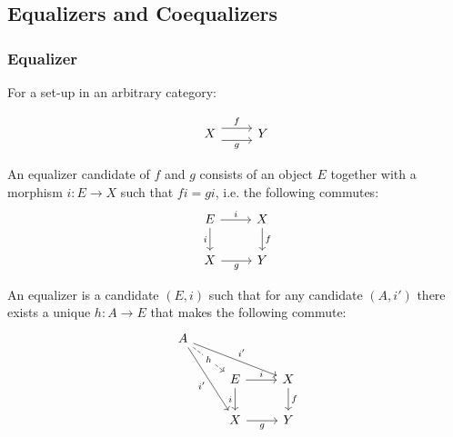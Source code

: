 \subsection{Equalizers and Coequalizers}

\subsubsection*{Equalizer}

\begin{definition}
  For a set-up in an arbitrary category:
  \parencite{leinster:basic_category_theory}

  \[\begin{tikzcd}[ampersand replacement=\&]
    X \& Y
    \arrow["f", shift left=2, from=1-1, to=1-2]
    \arrow["g"', shift right=2, from=1-1, to=1-2]
  \end{tikzcd}\]

  An equalizer candidate of $f$ and $g$ consists of an object $E$ together with
  a morphism $i:E\to X$ such that $fi = gi$, i.e. the following commutes:
  \[\begin{tikzcd}[ampersand replacement=\&]
    E \& X \\
    X \& Y
    \arrow["f", from=1-2, to=2-2]
    \arrow["g"', from=2-1, to=2-2]
    \arrow["i"', from=1-1, to=2-1]
    \arrow["i", from=1-1, to=1-2]
  \end{tikzcd}\]

  An equalizer is a candidate $(E, i)$ such that for any candidate $(A,
  i')$ there exists a unique $h:A\to E$ that makes the following commute:
  \[\begin{tikzcd}[ampersand replacement=\&]
    A \\
    \& E \& X \\
    \& X \& Y
    \arrow["i"', from=2-2, to=3-2]
    \arrow["i", from=2-2, to=2-3]
    \arrow["f", from=2-3, to=3-3]
    \arrow["g"', from=3-2, to=3-3]
    \arrow["{i'}"', from=1-1, to=3-2]
    \arrow["{i'}", from=1-1, to=2-3]
    \arrow["h"{description}, dashed, from=1-1, to=2-2]
  \end{tikzcd}\]
\end{definition}

